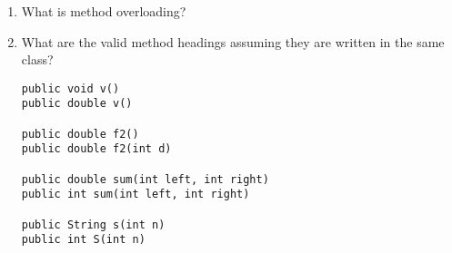 \begin{enumerate}

\item What is method overloading? 

\item What are the valid method headings assuming they are written in the same class?
\begin{lstlisting}
public void v()
public double v()

public double f2()
public double f2(int d)

public double sum(int left, int right)
public int sum(int left, int right)

public String s(int n)
public int S(int n)
\end{lstlisting}

\end{enumerate}